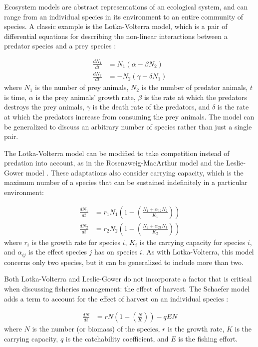 Ecosystem models are abstract representations of an ecological system, and can range from an individual species in its environment to an entire community of species.  A classic example is the Lotka-Volterra model, which is a pair of differential equations for describing the non-linear interactions between a predator species and a prey species \cite{lotka1926, volterra1926}:

\begin{align}
   \frac{d N_1}{dt} &=   N_1 \left(\alpha - \beta  N_2\right) 
\\ \frac{d N_2}{dt} &= - N_2 \left(\gamma - \delta N_1\right)
\end{align}
where $N_1$ is the number of prey animals, $N_2$ is the number of predator animals, $t$ is time, $\alpha$ is the prey animals' growth rate, $\beta$ is the rate at which the predators destroys the prey animals, $\gamma$ is the death rate of the predators, and $\delta$ is the rate at which the predators increase from consuming the prey animals.  The model can be generalized to discuss an arbitrary number of species rather than just a single pair.

The Lotka-Volterra model can be modified to take competition instead of predation into account, as in the Rosenzweig-MacArthur model \cite{rosenzweig1963} and the Leslie-Gower model \cite{leslie1960}.  These adaptations also consider carrying capacity, which is the maximum number of a species that can be sustained indefinitely in a particular environment:

\begin{align}
   \frac{d N_1}{dt} &= r_1 N_1 \left(1 - \left(\frac{N_1 + \alpha_{12} N_2}{K_1}\right)\right)
\\ \frac{d N_2}{dt} &= r_2 N_2 \left(1 - \left(\frac{N_2 + \alpha_{21} N_1}{K_2}\right)\right)
\end{align}
where $r_i$ is the growth rate for species $i$, $K_i$ is the carrying capacity for species $i$, and $\alpha_{ij}$ is the effect species $j$ has on species $i$.  As with Lotka-Volterra, this model concerns only two species, but it can be generalized to include more than two.

Both Lotka-Volterra and Leslie-Gower do not incorporate a factor that is critical when discussing fisheries management: the effect of harvest.  The Schaefer model adds a term to account for the effect of harvest on an individual species \cite{schaefer1957}:

\begin{align}
   \frac{d N}{dt} &= r N \left(1 - \left(\frac{N}{K}\right)\right) - q E N
\end{align}
where $N$ is the number (or biomass) of the species, $r$ is the growth rate, $K$ is the carrying capacity, $q$ is the catchability coefficient, and $E$ is the fishing effort.

